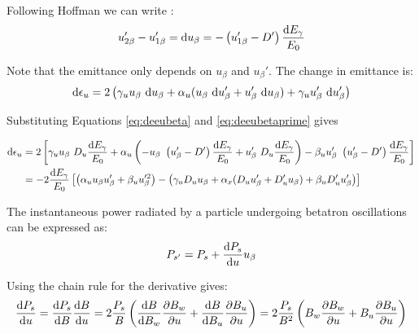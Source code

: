 Following Hoffman we can write \cite{hofmann_2004}:
\begin{equation}
    u_{2\beta}' - u_{1\beta}' = \text{d} u_\beta = - \left( u_{1\beta}' - D' \right) \frac{\text{d} E_\gamma}{E_0}
    \label{eq:deeubetaprime}
\end{equation}

Note that the emittance only depends on $u_\beta$ and $u_\beta'$. The change in emittance is:
\begin{equation}
    \text{d} \epsilon_u = 2 \left( \gamma_u u_\beta\ \text{d} u_\beta + \alpha_u (u_\beta\ \text{d} u_\beta' + u_\beta'\ \text{d} u_\beta) + \gamma_u u_\beta'\ \text{d} u_\beta' \right)
\end{equation}

Substituting Equations \eqref{eq:deeubeta} and \eqref{eq:deeubetaprime} gives

\begin{align}
    \text{d} \epsilon_u &= 2 \left[ \gamma_u u_\beta\ D_u \frac{\text{d} E_\gamma}{E_0} + \alpha_u \left(- u_\beta\ \left( u_\beta' - D' \right) \frac{\text{d} E_\gamma}{E_0} + u_\beta'\ D_u \frac{\text{d} E_\gamma}{E_0} \right) - \beta_u u_\beta'\ \left( u_\beta' - D' \right) \frac{\text{d} E_\gamma}{E_0} \right]\\
                    &= -2 \frac{\text{d} E_\gamma}{E_0} \left[ \left( \alpha_u u_\beta u_\beta' + \beta_u u_\beta'^2 \right)  - \left( \gamma_u D_u u_\beta + \alpha_x (D_u u_\beta' + D_u' u_\beta) + \beta_u D_u' u_\beta' \right)\right]
    \label{eq:changeinemittance}
\end{align}

The instantaneous power radiated by a particle undergoing betatron oscillations can be expressed as:
\begin{equation}
    P_{s'} = P_s + \frac{\text{d} {P_s}}{\text{d} {u}} u_\beta
\end{equation}

Using the chain rule for the derivative gives:
\begin{equation}
    \frac{\text{d} {P_s}}{\text{d} {u}} = \frac{\text{d} {P_s}}{\text{d} {B}} \frac{\text{d} {B}}{\text{d} {u}} = 2\frac{P_s}{B} \left( \frac{\text{d} {B}}{\text{d} {B_w}} \frac{\partial {B_w}}{\partial {u}} + \frac{\text{d} {B}}{\text{d} {B_u}} \frac{\partial {B_u}}{\partial {u}} \right) = 2 \frac{P_s}{B^2} \left( B_w \frac{\partial {B_w}}{\partial {u}} + B_u \frac{\partial {B_u}}{\partial {u}} \right)
\end{equation}

